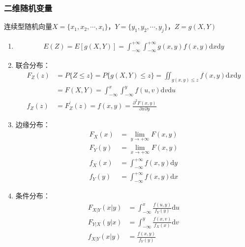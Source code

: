 \documentclass[12pt]{book}
\begin{document}
\subsubsection{二维随机变量}

连续型随机向量$X=\{x_1,x_2,\cdots,x_i\}$，$Y=\{y_1,y_2,\cdots,y_j\}$，$Z=g(X,Y)$

\begin{enumerate}[1.]
    \item \begin{gather*}
        E(Z) = E[g(X,Y)]
        = \int_{-\infty}^{+\infty}\int_{-\infty}^{+\infty}{g(x,y)f(x,y)\mathrm{d}x \mathrm{d}y}
    \end{gather*}
    \item 联合分布：
	\begin{align*}
        F_{Z}(z) &= P\{Z\leqslant z\}
        = P\{g(X,Y)\leqslant z\} 
        = \iint_{g(x,y)\leqslant z}{f(x,y)\mathrm{d}x\mathrm{d}y} \\
        &= F(X,Y) 
        = \int_{-\infty}^{x}\int_{-\infty}^{y}{ f(u,v) \mathrm{d}v \mathrm{d}u }  \\
        f_{Z}(z) &= F_{Z}^{\prime}{(z)} = f(x,y) = \frac{\partial^2F\left(x,y\right)}{\partial x\partial y}
        \end{align*}
    \item 边缘分布：
    \begin{align*}
        F_{X}(x)&=\lim_{y\rightarrow+\infty} F(x,y) \\
        F_{Y}(y)&=\lim_{x\rightarrow+\infty} F(x,y) \\
        f_{X}(x)&=\int_{-\infty}^{+\infty}f\left(x,y\right) \mathrm{d}y \\
        f_{Y}(y)&=\int_{-\infty}^{+\infty}f(x,y)\mathrm{d}x
    \end{align*}
    \item 条件分布：
    \begin{align*}
        F_{X|Y}(x|y)& = \int_{-\infty}^{x}{ \frac{f(u,y)}{f_{Y}(y)}\mathrm{d}u } \\
        F_{Y|X}(y|x) &= \int_{-\infty}^{y}{ \frac{f(x,v)}{f_{X}(x)}\mathrm{d}v } \\
        f_{X|Y}(x|y) &= \frac{f(x,y)}{f_{Y}(y)} \\

\end{align*}
\end{enumerate}
\end{document}
